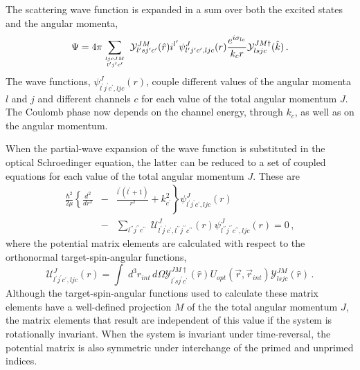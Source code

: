 \documentclass[twocolumn,amsmath,amssymb,10pt,groupedaddress,letter]{revtex4}
\begin{document}
The scattering wave function is expanded in a sum over both the excited
states and the angular momenta, \begin{equation}
\Psi=4\pi\sum_{{{ljcJM\atop l^{\prime}j^{\prime}c^{\prime}}}}\;{\mathcal{Y}}_{l^{\prime}sj^{\prime}c^{\prime}}^{JM}(\hat{r})i^{l^{\prime}}\psi_{l^{\prime}j^{\prime}c^{\prime},ljc}^{J}(r)\frac{e^{i\sigma_{lc}}}{k_{c}r}{\mathcal{Y}}_{lsjc}^{JM\dagger}(\hat{k})\,.\label{cpar}\end{equation}
The wave functions, $\psi_{l^{\prime}j^{\prime}c^{\prime},ljc}^{J}(r)$,
couple different values of the angular momenta $l$ and $j$ and different
channels $c$ for each value of the total angular momentum $J$.  The
Coulomb phase now depends on the channel energy, through $k_{c}$,
as well as on the angular momentum.

When the partial-wave expansion of the wave function is substituted
in the optical Schroedinger equation, the latter can be reduced
to a set of coupled equations for each value of the total angular
momentum $J$. These are \begin{eqnarray}
\frac{\hbar^{2}}{2\mu}\left\{ \frac{d^{2}}{dr^{2}}\right. & - & \left.\frac{l^{\prime}(l^{\prime}+1)}{r^{2}}+k_{c^{\prime}}^{2}\right\} \psi_{l^{\prime}j^{\prime}c^{\prime},ljc}^{J}(r)\\
 & - & \sum_{l^{\prime\prime}j^{\prime\prime}c^{\prime\prime}}\;{\mathcal{U}}_{l^{\prime}j^{\prime}c^{\prime},l^{\prime\prime}j^{\prime\prime}c^{\prime\prime}}^{J}(r)\psi_{l^{\prime\prime}j^{\prime\prime}c^{\prime\prime},ljc}^{J}(r)=0\,,\nonumber \end{eqnarray}
 where the potential matrix elements are calculated with respect to
the orthonormal target-spin-angular functions, \begin{equation}
{\mathcal{U}}_{l^{\prime}j^{\prime}c^{\prime},ljc}^{J}(r)=\int\; d^{3}r_{int}\, d\Omega{\mathcal{Y}}_{l^{\prime}sj^{\prime}c^{\prime}}^{JM\dagger}(\hat{r})U_{opt}(\vec{r},\vec{r}_{int}){\mathcal{Y}}_{lsjc}^{JM}(\hat{r})\,.\label{uljc}\end{equation}
 Although the target-spin-angular functions used to calculate these
matrix elements have a well-defined projection $M$ of the the total
angular momentum $J$, the matrix elements that result are independent
of this value if the system is rotationally invariant. When the system
is invariant under time-reversal, the potential matrix is also symmetric
under interchange of the primed and unprimed indices.
\end{document}
